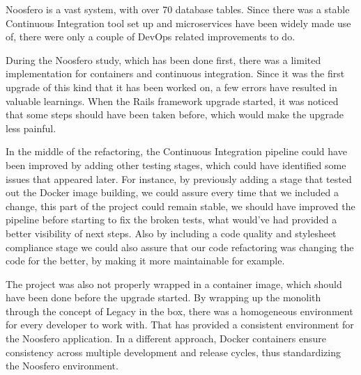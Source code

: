 \begin{table}[ht]
\caption{Noosfero Comparative: Before DevOps and After DevOps.}
\label{table:noosfero}
\end{table}

Noosfero is a vast system, with over 70 database tables. Since there was a
stable Continuous Integration tool set up and microservices have been widely
made use of, there were only a couple of DevOps related improvements to do.

During the Noosfero study, which has been done first, there was a limited
implementation for containers and continuous integration. Since it was the first
upgrade of this kind that it has been worked on, a few errors have resulted in
valuable learnings. When the Rails framework upgrade started, it was noticed
that some steps should have been taken before, which would make the upgrade less
painful. 

In the middle of the refactoring, the Continuous Integration pipeline could have
been improved by adding other testing stages, which could have identified some
issues that appeared later. For instance, by previously adding a stage that
tested out the Docker image building, we could assure every time that we
included a change, this part of the project could remain stable, we should have
improved the pipeline before starting to fix the broken
tests, what would've had provided a better visibility of next steps. Also by
including a code quality and stylesheet compliance stage we could also assure
that our code refactoring was changing the code for the better, by making it
more maintainable for example. 

The project was also not properly wrapped in a container image, which should
have been done before the upgrade started. By wrapping up the monolith through
the concept of Legacy in the box, there was a homogeneous environment for every
developer to work with. That has provided a consistent environment for the
Noosfero application. In a different approach, Docker containers ensure
consistency across multiple development and release cycles, thus standardizing
the Noosfero environment.

